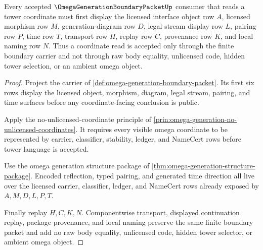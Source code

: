 \begin{theorem}
\label{thm:omega-generation-boundary-packet-row-exposure}
Every accepted $\OmegaGenerationBoundaryPacketUp$ consumer that reads a tower coordinate must first display the licensed interface object row $A$, licensed morphism row $M$, generation-diagram row $D$, legal stream display row $L$, pairing row $P$, time row $T$, transport row $H$, replay row $C$, provenance row $K$, and local naming row $N$. Thus a coordinate read is accepted only through the finite boundary carrier and not through raw body equality, unlicensed code, hidden tower selection, or an ambient omega object.
\end{theorem}
\begin{proof}
Project the carrier of \autoref{def:omega-generation-boundary-packet}. Its first six rows display the licensed object, morphism, diagram, legal stream, pairing, and time surfaces before any coordinate-facing conclusion is public.

Apply the no-unlicensed-coordinate principle of \autoref{prin:omega-generation-no-unlicensed-coordinates}. It requires every visible omega coordinate to be represented by carrier, classifier, stability, ledger, and NameCert rows before tower language is accepted.

Use the omega generation structure package of \autoref{thm:omega-generation-structure-package}. Encoded reflection, typed pairing, and generated time direction all live over the licensed carrier, classifier, ledger, and NameCert rows already exposed by $A,M,D,L,P,T$.

Finally replay $H,C,K,N$. Componentwise transport, displayed continuation replay, package provenance, and local naming preserve the same finite boundary packet and add no raw body equality, unlicensed code, hidden tower selector, or ambient omega object.
\end{proof}

